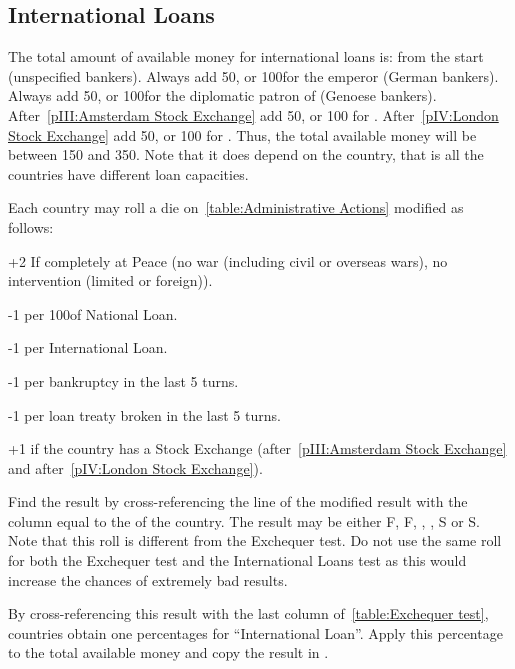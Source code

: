 
\subsection{International Loans}\label{chPeace:International loans}
 The total amount of available money for international
loans is:
\ducats from the start (unspecified bankers).
\bparag Always add 50\ducats, or 100\ducats for the emperor (German bankers).
\bparag Always add 50\ducats, or 100\ducats for the diplomatic patron of
\paysGenes (Genoese bankers).
\bparag After~\ref{pIII:Amsterdam Stock Exchange} add 50\ducats, or 100\ducats
for \HOL.
\bparag After~\ref{pIV:London Stock Exchange} add 50\ducats, or 100\ducats
for \ANG.
\bparag Thus, the total available money will be between 150 and
350\ducats. Note that it does depend on the country, that is all the countries
have different loan capacities.

 Each country may roll a die
on~\ref{table:Administrative Actions} modified as follows:
\begin{modlist}
\item[+2] If completely at Peace (no war (including civil or overseas wars),
  no intervention (limited or foreign)).
\item[-1 ] per 100\ducats of National Loan.
\item[-1] per International Loan.
\item[-1 ] per bankruptcy in the last 5 turns.
\item[-1] per loan treaty broken in the last 5 turns.
\item[+1 ] if the country has a Stock Exchange (\HOL after~\ref{pIII:Amsterdam
    Stock Exchange} and \ANG after~\ref{pIV:London Stock Exchange}).
\end{modlist}
\bparag Find the result by cross-referencing the line of the modified result
with the column equal to the \STAB of the country.
\bparag The result may be either F\textetoile, F, \undemi, \undemi\textetoile,
S or S\textetoile.
\bparag Note that this roll is different from the Exchequer test. Do not use
the same roll for both the Exchequer test and the International Loans test as
this would increase the chances of extremely bad results.

 By cross-referencing this result with the last
column of~\ref{table:Exchequer test}, countries obtain one percentages for
``International Loan''.
\bparag Apply this percentage to the total available money and copy the result
in .

